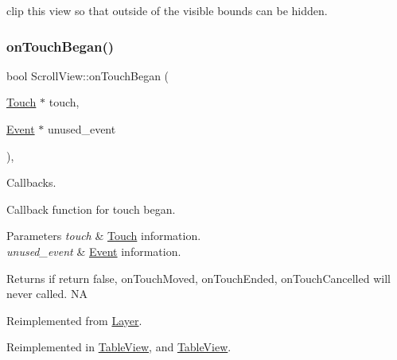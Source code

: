clip this view so that outside of the visible bounds can be hidden. \mbox{\label{classScrollView_a18daa7ba9b5f802e65a6df2dde10a625}} 
\subsubsection{\texorpdfstring{on\+Touch\+Began()}{onTouchBegan()}\hspace{0.1cm}{\footnotesize\ttfamily [1/2]}}
{\footnotesize\ttfamily bool Scroll\+View\+::on\+Touch\+Began (\begin{DoxyParamCaption}\item[{\hyperlink{classTouch}{Touch} $\ast$}]{touch,  }\item[{\hyperlink{classEvent}{Event} $\ast$}]{unused\+\_\+event }\end{DoxyParamCaption})\hspace{0.3cm}{\ttfamily [override]}, {\ttfamily [virtual]}}



Callbacks. 

Callback function for touch began.


\begin{DoxyParams}{Parameters}
{\em touch} & \hyperlink{classTouch}{Touch} information. \\
\hline
{\em unused\+\_\+event} & \hyperlink{classEvent}{Event} information. \\
\hline
\end{DoxyParams}
\begin{DoxyReturn}{Returns}
if return false, on\+Touch\+Moved, on\+Touch\+Ended, on\+Touch\+Cancelled will never called.  NA 
\end{DoxyReturn}


Reimplemented from \hyperlink{classLayer_abe632dc131bdeb3d603090d4d31db25c}{Layer}.



Reimplemented in \hyperlink{classTableView_a57908fcd3fe592e50ff721dd84675a01}{Table\+View}, and \hyperlink{classTableView_a195a00658f0ba79be1b59935569c3c7c}{Table\+View}.

\mbox{\label{classScrollView_a3b24de8c28e9cfd8a2f44d626266e1be}} 
